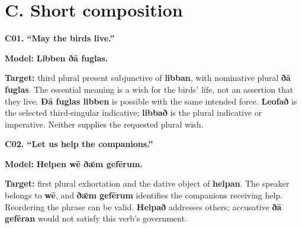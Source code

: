 \section*{C. Short composition}

\par\begin{minipage}{\linewidth}\raggedright
\textbf{C01. “May the birds live.”}

\textbf{Model:} \textbf{Libben ðā fuglas.}

\textbf{Target:} third plural present subjunctive of \textbf{libban}, with nominative plural \textbf{ðā fuglas}. The essential meaning is a wish for the birds’ life, not an assertion that they live. \textbf{Ðā fuglas libben} is possible with the same intended force. \textbf{Leofað} is the selected third-singular indicative; \textbf{libbað} is the plural indicative or imperative. Neither supplies the requested plural wish.

\end{minipage}\par\addvspace{4pt}

\par\begin{minipage}{\linewidth}\raggedright
\textbf{C02. “Let us help the companions.”}

\textbf{Model:} \textbf{Helpen wē ðǣm gefērum.}

\textbf{Target:} first plural exhortation and the dative object of \textbf{helpan}. The speaker belongs to \textbf{wē}, and \textbf{ðǣm gefērum} identifies the companions receiving help. Reordering the phrase can be valid. \textbf{Helpað} addresses others; accusative \textbf{ðā gefēran} would not satisfy this verb’s government.

\end{minipage}\par\addvspace{4pt}

